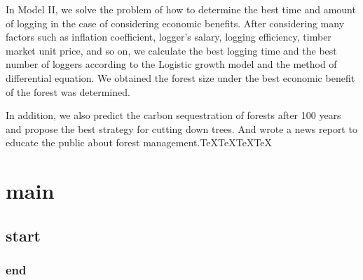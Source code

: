 \documentclass{article}
\begin{document}
In Model II, we solve the problem of how to determine the best time and amount
of logging in the case of considering economic benefits. After considering many
factors such as inflation coefficient, logger's salary, logging efficiency,
timber market unit price, and so on, we calculate the best logging time and the
best number of loggers according to the Logistic growth model and the method of
differential equation. We obtained the forest size under the best economic
benefit of the forest was determined.

In addition, we also predict the carbon sequestration of forests after 100
years and propose the best strategy for cutting down trees. And wrote a news
report to educate the public about forest management.\TeX\TeX\TeX\TeX
\newpage
\section{main}
\subsection{start}
\subsubsection{end}
\end{document}
